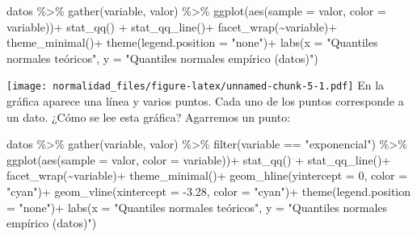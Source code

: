 \documentclass[
]{article}
\newenvironment{Shaded}{\begin{snugshade}}{\end{snugshade}}
\newcommand{\AttributeTok}[1]{\textcolor[rgb]{0.77,0.63,0.00}{#1}}
\newcommand{\DecValTok}[1]{\textcolor[rgb]{0.00,0.00,0.81}{#1}}
\newcommand{\FloatTok}[1]{\textcolor[rgb]{0.00,0.00,0.81}{#1}}
\newcommand{\FunctionTok}[1]{\textcolor[rgb]{0.00,0.00,0.00}{#1}}
\newcommand{\NormalTok}[1]{#1}
\newcommand{\SpecialCharTok}[1]{\textcolor[rgb]{0.00,0.00,0.00}{#1}}
\newcommand{\StringTok}[1]{\textcolor[rgb]{0.31,0.60,0.02}{#1}}
\begin{document}
\begin{Shaded}
\begin{Highlighting}[]
\NormalTok{datos }\SpecialCharTok{\%\textgreater{}\%} 
  \FunctionTok{gather}\NormalTok{(variable, valor) }\SpecialCharTok{\%\textgreater{}\%} 
  \FunctionTok{ggplot}\NormalTok{(}\FunctionTok{aes}\NormalTok{(}\AttributeTok{sample =}\NormalTok{ valor, }\AttributeTok{color =}\NormalTok{ variable))}\SpecialCharTok{+}
  \FunctionTok{stat\_qq}\NormalTok{() }\SpecialCharTok{+} \FunctionTok{stat\_qq\_line}\NormalTok{()}\SpecialCharTok{+}
  \FunctionTok{facet\_wrap}\NormalTok{(}\SpecialCharTok{\textasciitilde{}}\NormalTok{variable)}\SpecialCharTok{+}
  \FunctionTok{theme\_minimal}\NormalTok{()}\SpecialCharTok{+}
  \FunctionTok{theme}\NormalTok{(}\AttributeTok{legend.position =} \StringTok{"none"}\NormalTok{)}\SpecialCharTok{+}
  \FunctionTok{labs}\NormalTok{(}\AttributeTok{x =} \StringTok{"Quantiles normales teóricos"}\NormalTok{,}
       \AttributeTok{y =} \StringTok{"Quantiles normales empírico (datos)"}\NormalTok{)}
\end{Highlighting}
\end{Shaded}

\texttt{[image: normalidad\_files/figure-latex/unnamed-chunk-5-1.pdf]} En
la gráfica aparece una línea y varios puntos. Cada uno de los puntos
corresponde a un dato. ¿Cómo se lee esta gráfica? Agarremos un punto:

\begin{Shaded}
\begin{Highlighting}[]
\NormalTok{datos }\SpecialCharTok{\%\textgreater{}\%} 
  \FunctionTok{gather}\NormalTok{(variable, valor) }\SpecialCharTok{\%\textgreater{}\%} \FunctionTok{filter}\NormalTok{(variable }\SpecialCharTok{==} \StringTok{"exponencial"}\NormalTok{) }\SpecialCharTok{\%\textgreater{}\%} 
  \FunctionTok{ggplot}\NormalTok{(}\FunctionTok{aes}\NormalTok{(}\AttributeTok{sample =}\NormalTok{ valor, }\AttributeTok{color =}\NormalTok{ variable))}\SpecialCharTok{+}
  \FunctionTok{stat\_qq}\NormalTok{() }\SpecialCharTok{+} \FunctionTok{stat\_qq\_line}\NormalTok{()}\SpecialCharTok{+}
  \FunctionTok{facet\_wrap}\NormalTok{(}\SpecialCharTok{\textasciitilde{}}\NormalTok{variable)}\SpecialCharTok{+}
  \FunctionTok{theme\_minimal}\NormalTok{()}\SpecialCharTok{+}
  \FunctionTok{geom\_hline}\NormalTok{(}\AttributeTok{yintercept =} \DecValTok{0}\NormalTok{, }\AttributeTok{color =} \StringTok{"cyan"}\NormalTok{)}\SpecialCharTok{+}
  \FunctionTok{geom\_vline}\NormalTok{(}\AttributeTok{xintercept =} \SpecialCharTok{{-}}\FloatTok{3.28}\NormalTok{, }\AttributeTok{color =} \StringTok{"cyan"}\NormalTok{)}\SpecialCharTok{+}
  \FunctionTok{theme}\NormalTok{(}\AttributeTok{legend.position =} \StringTok{"none"}\NormalTok{)}\SpecialCharTok{+}
  \FunctionTok{labs}\NormalTok{(}\AttributeTok{x =} \StringTok{"Quantiles normales teóricos"}\NormalTok{,}
       \AttributeTok{y =} \StringTok{"Quantiles normales empírico (datos)"}\NormalTok{)}
\end{Highlighting}
\end{Shaded}
\end{document}
